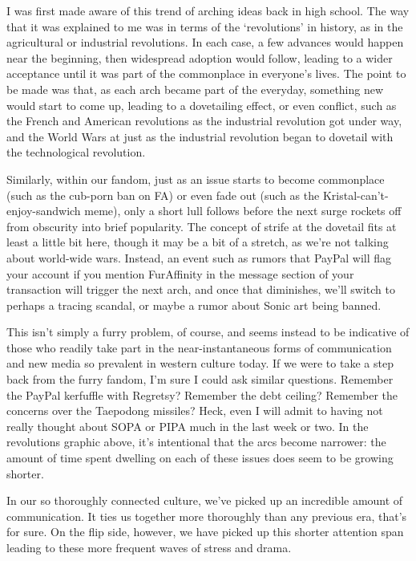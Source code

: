 I was first made aware of this trend of arching ideas back in high school. The way that it was explained to me was in terms of the `revolutions' in history, as in the agricultural or industrial revolutions. In each case, a few advances would happen near the beginning, then widespread adoption would follow, leading to a wider acceptance until it was part of the commonplace in everyone's lives. The point to be made was that, as each arch became part of the everyday, something new would start to come up, leading to a dovetailing effect, or even conflict, such as the French and American revolutions as the industrial revolution got under way, and the World Wars at just as the industrial revolution began to dovetail with the technological revolution.

Similarly, within our fandom, just as an issue starts to become commonplace (such as the cub-porn ban on FA) or even fade out (such as the Kristal-can't-enjoy-sandwich meme), only a short lull follows before the next surge rockets off from obscurity into brief popularity. The concept of strife at the dovetail fits at least a little bit here, though it may be a bit of a stretch, as we're not talking about world-wide wars. Instead, an event such as rumors that PayPal will flag your account if you mention FurAffinity in the message section of your transaction will trigger the next arch, and once that diminishes, we'll switch to perhaps a tracing scandal, or maybe a rumor about Sonic art being banned.

This isn't simply a furry problem, of course, and seems instead to be indicative of those who readily take part in the near-instantaneous forms of communication and new media so prevalent in western culture today. If we were to take a step back from the furry fandom, I'm sure I could ask similar questions. Remember the PayPal kerfuffle with Regretsy? Remember the debt ceiling? Remember the concerns over the Taepodong missiles? Heck, even I will admit to having not really thought about SOPA or PIPA much in the last week or two. In the revolutions graphic above, it's intentional that the arcs become narrower: the amount of time spent dwelling on each of these issues does seem to be growing shorter.

In our so thoroughly connected culture, we've picked up an incredible amount of communication. It ties us together more thoroughly than any previous era, that's for sure. On the flip side, however, we have picked up this shorter attention span leading to these more frequent waves of stress and drama.


